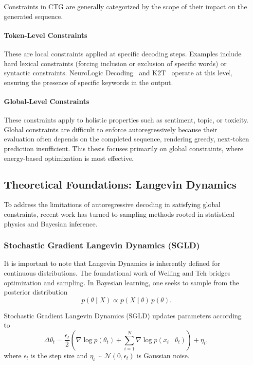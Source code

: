 \documentclass[11pt]{article}
\begin{document}
Constraints in CTG are generally categorized by the scope of their impact on the generated sequence.

\paragraph{Token-Level Constraints}
These are local constraints applied at specific decoding steps. Examples include hard lexical constraints (forcing inclusion or exclusion of specific words) or syntactic constraints. NeuroLogic Decoding~\cite{lu-etal-2021-neurologic} and K2T~\cite{pascual-etal-2021-plug-play} operate at this level, ensuring the presence of specific keywords in the output.

\paragraph{Global-Level Constraints}
These constraints apply to holistic properties such as sentiment, topic, or toxicity. Global constraints are difficult to enforce autoregressively because their evaluation often depends on the completed sequence, rendering greedy, next-token prediction insufficient. This thesis focuses primarily on global constraints, where energy-based optimization is most effective.

\subsection{Theoretical Foundations: Langevin Dynamics}

To address the limitations of autoregressive decoding in satisfying global constraints, recent work has turned to sampling methods rooted in statistical physics and Bayesian inference.

\subsubsection{Stochastic Gradient Langevin Dynamics (SGLD)}

It is important to note that Langevin Dynamics is inherently defined for continuous distributions. The foundational work of Welling and Teh \cite{10.5555/3104482.3104568} bridges optimization and sampling. In Bayesian learning, one seeks to sample from the posterior distribution
\begin{equation}
p(\theta \mid X) \propto p(X \mid \theta)\, p(\theta).
\end{equation}

Stochastic Gradient Langevin Dynamics (SGLD) updates parameters according to
\begin{equation}
\Delta \theta_t =
\frac{\epsilon_t}{2}
\left(
\nabla \log p(\theta_t) +
\sum_{i=1}^{N} \nabla \log p(x_i \mid \theta_t)
\right)
+ \eta_t,
\end{equation}
where $\epsilon_t$ is the step size and $\eta_t \sim \mathcal{N}(0, \epsilon_t)$ is Gaussian noise.
\end{document}
